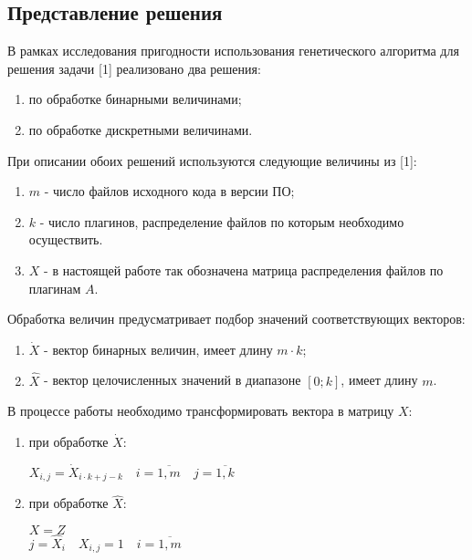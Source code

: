 \subsection*{Представление решения}
В рамках исследования пригодности использования генетического алгоритма для решения задачи [1] реализовано два решения:
\begin{enumerate}
  \item по обработке бинарными величинами;
  \item по обработке дискретными величинами.
\end{enumerate}

При описании обоих решений используются следующие величины из [1]:
\begin{enumerate}
  \item $m$ - число файлов исходного кода в версии ПО;
  \item $k$ - число плагинов, распределение файлов по которым необходимо осуществить.
  \item $X$ - в настоящей работе так обозначена матрица распределения файлов по плагинам $A$.
\end{enumerate}

Обработка величин предусматривает подбор значений соответствующих векторов:
\begin{enumerate}
  \item $\dot{X}$ - вектор бинарных величин, имеет длину $m \cdot k$;
  \item $\hat{X}$ - вектор целочисленных значений в диапазоне $[0; k]$, имеет длину $m$.
\end{enumerate}

В процессе работы необходимо трансформировать вектора в матрицу $X$:
\begin{enumerate}
  \item при обработке $\dot{X}$:
  \begin{center}
    $X_{i, j} = \dot{X}_{i \cdot k + j - k} \quad i=\overline{1, m} \quad j=\overline{1, k}$
  \end{center}
  \item при обработке $\hat{X}$:
  \begin{center}
    $X = Z$ \\
    $j = \hat{X}_{i} \quad X_{i, j} = 1 \quad i=\overline{1, m}$
  \end{center}
\end{enumerate}

